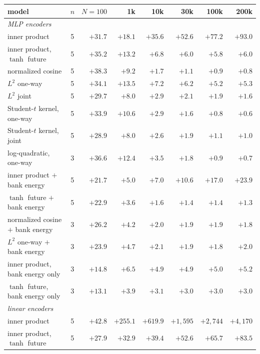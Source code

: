 \documentclass[11pt]{article}
\theoremstyle{plain}
\theoremstyle{definition}
\theoremstyle{remark}
\begin{document}
\begin{table}[ht]
 \centering
 \footnotesize
 \setlength{\tabcolsep}{3.5pt}
 \begin{tabular}{lcrrrrrr}
  \toprule
  model & $n$ & $N=100$ & 1k & 10k & 30k & 100k & 200k \\
  \midrule
  \multicolumn{8}{l}{\emph{MLP encoders}} \\
  inner product & 5 & $+31.7$ & $\mathbf{+18.1}$ & $+35.6$ & $+52.6$ & $+77.2$ & $+93.0$ \\
  inner product, $\tanh$ future & 5 & $+35.2$ & $+13.2$ & $+6.8$ & $+6.0$ & $+5.8$ & $+6.0$ \\
  normalized cosine & 5 & $+38.3$ & $+9.2$ & $+1.7$ & $+1.1$ & $+0.9$ & $+0.8$ \\
  $L^2$ one-way & 5 & $+34.1$ & $+13.5$ & $+7.2$ & $+6.2$ & $+5.2$ & $+5.3$ \\
  $L^2$ joint & 5 & $+29.7$ & $+8.0$ & $+2.9$ & $+2.1$ & $+1.9$ & $+1.6$ \\
  Student-$t$ kernel, one-way & 5 & $+33.9$ & $+10.6$ & $+2.9$ & $+1.6$ & $+0.8$ & $+0.6$ \\
  Student-$t$ kernel, joint & 5 & $+28.9$ & $+8.0$ & $+2.6$ & $+1.9$ & $+1.1$ & $+1.0$ \\
  log-quadratic, one-way & 3 & $+36.6$ & $+12.4$ & $+3.5$ & $+1.8$ & $+0.9$ & $+0.7$ \\
  \midrule
  inner product $+$ bank energy & 5 & $+21.7$ & $\mathbf{+5.0}$ & $+7.0$ & $+10.6$ & $+17.0$ & $+23.9$ \\
  $\tanh$ future $+$ bank energy & 5 & $+22.9$ & $+3.6$ & $+1.6$ & $+1.4$ & $+1.4$ & $+1.3$ \\
  normalized cosine $+$ bank energy & 3 & $+26.2$ & $+4.2$ & $+2.0$ & $+1.9$ & $+1.9$ & $+1.8$ \\
  $L^2$ one-way $+$ bank energy & 3 & $+23.9$ & $+4.7$ & $+2.1$ & $+1.9$ & $+1.8$ & $+2.0$ \\
  inner product, bank energy only & 3 & $+14.8$ & $+6.5$ & $+4.9$ & $+4.9$ & $+5.0$ & $+5.2$ \\
  $\tanh$ future, bank energy only & 3 & $+13.1$ & $+3.9$ & $+3.1$ & $+3.0$ & $+3.0$ & $+3.0$ \\
  \midrule
  \multicolumn{8}{l}{\emph{linear encoders}} \\
  inner product & 5 & $\mathbf{+42.8}$ & $+255.1$ & $+619.9$ & $+1{,}595$ & $+2{,}744$ & $+4{,}170$ \\
  inner product, $\tanh$ future & 5 & $\mathbf{+27.9}$ & $+32.9$ & $+39.4$ & $+52.6$ & $+65.7$ & $+83.5$ \\

\end{tabular}
\end{table}
\end{document}
